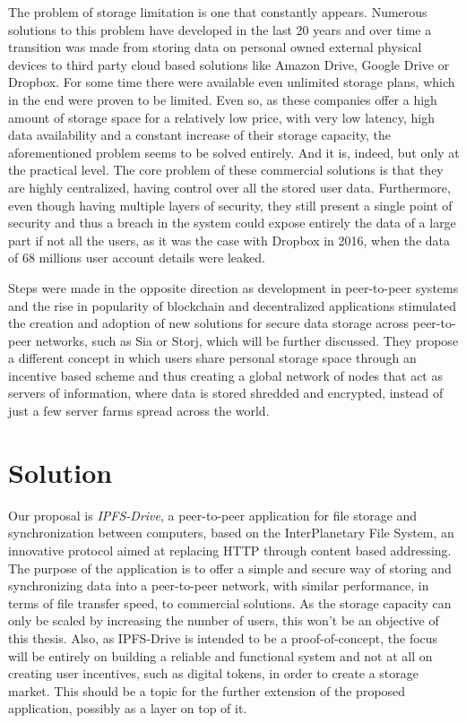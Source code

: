 \documentclass[12pt]{report}
\begin{document}
The problem of storage limitation is one that constantly appears. Numerous solutions to this problem have developed in the last 20 years and over time a transition was made from storing data on personal owned external physical devices to third party cloud based solutions like Amazon Drive, Google Drive or Dropbox. For some time there were available even unlimited storage plans, which in the end were proven to be limited. Even so, as these companies offer a high amount of storage space for a relatively low price, with very low latency, high data availability and a constant increase of their storage capacity, the aforementioned problem seems to be solved entirely. And it is, indeed, but only at the practical level. The core problem of these commercial solutions is that they are highly centralized, having control over all the stored user data. Furthermore, even though having multiple layers of security, they still present a single point of security and thus a breach in the system could expose entirely the data of a large part if not all the users, as it was the case with Dropbox in 2016, when the data of 68 millions user account details were leaked.

Steps were made in the opposite direction as development in peer-to-peer systems and the rise in popularity of blockchain and decentralized applications stimulated the creation and adoption of new solutions for secure data storage across peer-to-peer networks, such as Sia or Storj, which will be further discussed. They propose a different concept in which users share personal storage space through an incentive based scheme and thus creating a global network of nodes that act as servers of information, where data is stored shredded and encrypted, instead of just a few server farms spread across the world.

\section{Solution}

Our proposal is \textit{IPFS-Drive}, a peer-to-peer application for file storage and synchronization between computers, based on the InterPlanetary File System, an innovative protocol aimed at replacing HTTP through content based addressing. The purpose of the application is to offer a simple and secure way of storing and synchronizing data into a peer-to-peer network, with similar performance, in terms of file transfer speed, to commercial solutions. As the storage capacity can only be scaled by increasing the number of users, this won't be an objective of this thesis. Also, as IPFS-Drive is intended to be a proof-of-concept, the focus will be entirely on building a reliable and functional system and not at all on creating user incentives, such as digital tokens, in order to create a storage market. This should be a topic for the further extension of the proposed application, possibly as a layer on top of it. 
\end{document}
